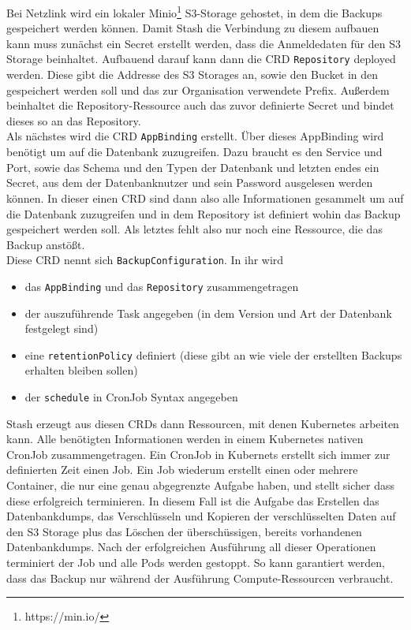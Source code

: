 Bei Netzlink wird ein lokaler Minio\footnote{https://min.io/} \ac{S3}-Storage gehostet, in dem die Backups gespeichert werden können.
Damit Stash die Verbindung zu diesem aufbauen kann muss zunächst ein Secret erstellt werden, dass die Anmeldedaten für den \ac{S3} Storage beinhaltet.
Aufbauend darauf kann dann die \ac{CRD} \texttt{Repository} deployed werden. 
Diese gibt die Addresse des \ac{S3} Storages an, sowie den Bucket in den gespeichert werden soll und das zur Organisation verwendete Prefix.
Außerdem beinhaltet die Repository-Ressource auch das zuvor definierte Secret und bindet dieses so an das Repository.
\\
Als nächstes wird die \ac{CRD} \texttt{AppBinding} erstellt. 
Über dieses AppBinding wird benötigt um auf die Datenbank zuzugreifen. 
Dazu braucht es den Service und Port, sowie das Schema und den Typen der Datenbank und letzten endes ein Secret, aus dem der Datenbanknutzer und sein Password ausgelesen werden können.
In dieser einen \ac{CRD} sind dann also alle Informationen gesammelt um auf die Datenbank zuzugreifen und in dem Repository ist definiert wohin das Backup gespeichert werden soll.
Als letztes fehlt also nur noch eine Ressource, die das Backup anstößt.
\\
Diese \ac{CRD} nennt sich \texttt{BackupConfiguration}. 
In ihr wird 
\begin{itemize}
    \item das \texttt{AppBinding} und das \texttt{Repository} zusammengetragen
    \item der auszuführende Task angegeben (in dem Version und Art der Datenbank festgelegt sind)
    \item eine \texttt{retentionPolicy} definiert (diese gibt an wie viele der erstellten Backups erhalten bleiben sollen)
    \item der \texttt{schedule} in CronJob Syntax angegeben
\end{itemize}
Stash erzeugt aus diesen \ac{CRD}s dann Ressourcen, mit denen Kubernetes arbeiten kann.
Alle benötigten Informationen werden in einem Kubernetes nativen CronJob zusammengetragen.
Ein CronJob in Kubernets erstellt sich immer zur definierten Zeit einen Job. 
Ein Job wiederum erstellt einen oder mehrere Container, die nur eine genau abgegrenzte Aufgabe haben, und stellt sicher dass diese erfolgreich terminieren. 
In diesem Fall ist die Aufgabe das Erstellen das Datenbankdumps, das Verschlüsseln und Kopieren der verschlüsselten Daten auf den \ac{S3} Storage plus das Löschen der überschüssigen, bereits vorhandenen Datenbankdumps.
Nach der erfolgreichen Ausführung all dieser Operationen terminiert der Job und alle Pods werden gestoppt. 
So kann garantiert werden, dass das Backup nur während der Ausführung Compute-Ressourcen verbraucht. 


